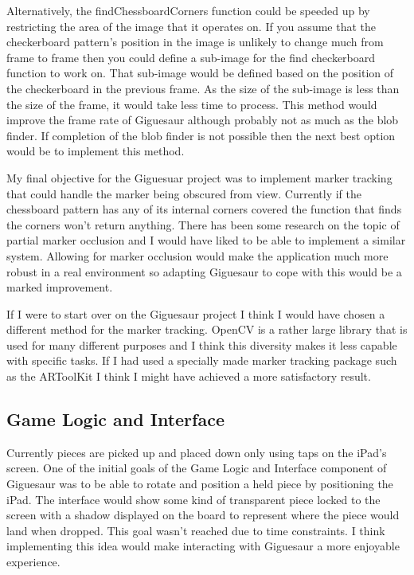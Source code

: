 \documentclass{article}
\begin{document}
Alternatively, the findChessboardCorners function could be speeded up by restricting the area of the image that it operates on. If you assume that the checkerboard pattern's position in the image is unlikely to change much from frame to frame then you could define a sub-image for the find checkerboard function to work on. That sub-image would be defined based on the position of the checkerboard in the previous frame. As the size of the sub-image is less than the size of the frame, it would take less time to process. This method would improve the frame rate of Giguesaur although probably not as much as the blob finder. If completion of the blob finder is not possible then the next best option would be to implement this method. 

My final objective for the Giguesuar project was to implement marker tracking that could handle the marker being obscured from view. Currently if the chessboard pattern has any of its internal corners covered the function that finds the corners won't return anything. There has been some research on the topic of partial marker occlusion \cite{occlusion} and I would have liked to be able to implement a similar system. Allowing for marker occlusion would make the application much more robust in a real environment so adapting Giguesaur to cope with this would be a marked improvement. 

If I were to start over on the Giguesaur project I think I would have chosen a different method for the marker tracking. OpenCV is a rather large library that is used for many different purposes and I think this diversity makes it less capable with specific tasks. If I had used a specially made marker tracking package such as the ARToolKit I think I might have achieved a more satisfactory result. 

\subsection{Game Logic and Interface}
Currently pieces are picked up and placed down only using taps on the iPad's screen. One of the initial goals of the Game Logic and Interface component of Giguesaur was to be able to rotate and position a held piece by positioning the iPad. The interface would show some kind of transparent piece locked to the screen with a shadow displayed on the board to represent where the piece would land when dropped. This goal wasn't reached due to time constraints. I think implementing this idea would make interacting with Giguesaur a more enjoyable experience.
\end{document}
